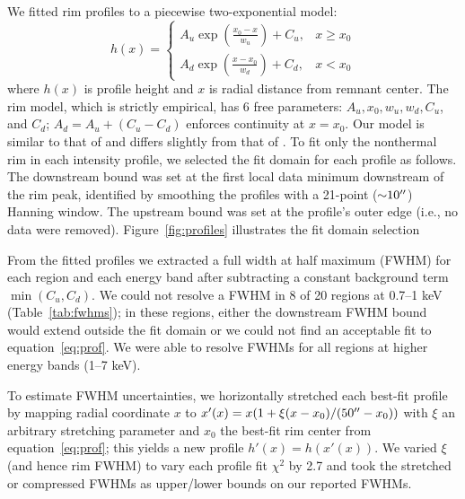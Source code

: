 \documentclass[iop, apj, numberedappendix]{emulateapj}
\newcommand*{\abt}{\mathord{\sim}} %
\begin{document}
We fitted rim profiles to a piecewise two-exponential model:
\begin{equation} \label{eq:prof}
    h(x) =
    \begin{cases}
        A_u \exp \left(\frac{x_0 - x}{w_u}\right) + C_u, &x \geq x_0 \\
        A_d \exp \left(\frac{x - x_0}{w_d}\right) + C_d, &x < x_0
    \end{cases}
\end{equation}
where $h(x)$ is profile height and $x$ is radial distance from remnant center.
The rim model, which is strictly empirical, has 6 free parameters:
$A_u, x_0, w_u, w_d, C_u$, and $C_d$; $A_d = A_u + (C_u - C_d)$ enforces
continuity at $x=x_0$. Our model is similar to that of \citet{bamba2003,
bamba2005-hist} and differs slightly from that of .
To fit only the nonthermal rim in each intensity profile, we selected the fit
domain for each profile as follows.  The downstream bound was set at the first
local data minimum downstream of the rim peak, identified by smoothing the
profiles with a 21-point ($\abt 10\arcsec$) Hanning window.  The upstream bound
was set at the profile's outer edge (i.e., no data were removed).
Figure~\ref{fig:profiles} illustrates the fit domain selection

\begin{figure*}%
    \iftoggle{manuscript}{
        \epsscale{1}
    }{}
    \caption{Best fit profiles with measured FWHMs demarcated for each energy
        band in Region 1 (top) and Region 16 (bottom).  Energy bands increase
        from left to right.  Data points in red were excluded from profile
        fitting domains as described in text.}
    \label{fig:profiles}
\end{figure*}

From the fitted profiles we extracted a full width at half maximum (FWHM) for
each region and each energy band after subtracting a constant background term
$\min(C_u, C_d)$.  We could not resolve a FWHM in 8 of 20 regions at 0.7--1 keV
(Table~\ref{tab:fwhms}); in these regions, either the downstream FWHM bound
would extend outside the fit domain or we could not find an acceptable fit to
equation~\eqref{eq:prof}.  We were able to resolve FWHMs for all regions at
higher energy bands (1--7 keV).

To estimate FWHM uncertainties, we horizontally stretched each best-fit
profile by mapping radial coordinate $x$ to
$x'(x) = x (1 + \xi (x-x_0)/(50\mbox{$^{\prime\prime}$}-x_0))$ with $\xi$ an arbitrary stretching
parameter and $x_0$ the best-fit rim center from equation~\eqref{eq:prof};
this yields a new profile $h'(x) = h(x'(x))$.
We varied $\xi$ (and hence rim FWHM) to vary each profile fit $\chi^2$ by 2.7
and took the stretched or compressed FWHMs as upper/lower bounds on our
reported FWHMs.
\end{document}
